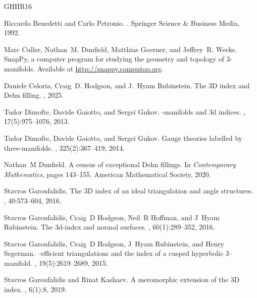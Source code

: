 \documentclass[11pt]{amsart}
\begin{document}
\begin{thebibliography}{GHHR16}

Riccardo Benedetti and Carlo Petronio.
.
\newblock Springer Science \& Business Media, 1992.

Marc Culler, Nathan~M. Dunfield, Matthias Goerner, and Jeffrey~R. Weeks.
\newblock Snap{P}y, a computer program for studying the geometry and topology
  of $3$-manifolds.
\newblock Available at \url{http://snappy.computop.org}.

Daniele Celoria, Craig~D. Hodgson, and J.~Hyam Rubinstein.
\newblock The $3${D} index and {D}ehn filling.
, 2025.

Tudor Dimofte, Davide Gaiotto, and Sergei Gukov.
-manifolds and 3d indices.
,
  17(5):975--1076, 2013.

Tudor Dimofte, Davide Gaiotto, and Sergei Gukov.
\newblock Gauge theories labelled by three-manifolds.
, 325(2):367--419, 2014.

Nathan~M Dunfield.
\newblock A census of exceptional {D}ehn fillings.
\newblock In {\em Contemporary Mathematics}, pages 143--155. American
  Mathematical Society, 2020.

Stavros Garoufalidis.
\newblock The 3{D} index of an ideal triangulation and angle structures.
, 40:573--604, 2016.

Stavros Garoufalidis, Craig~D Hodgson, Neil~R Hoffman, and J~Hyam Rubinstein.
\newblock The 3d-index and normal surfaces.
, 60(1):289--352, 2016.

Stavros Garoufalidis, Craig~D Hodgson, J~Hyam Rubinstein, and Henry Segerman.
--efficient triangulations and the index of a cusped hyperbolic
  3--manifold.
, 19(5):2619--2689, 2015.

Stavros Garoufalidis and Rinat Kashaev.
\newblock A meromorphic extension of the 3{D} index.
, 6(1):8, 2019.


\end{thebibliography}
\end{document}
